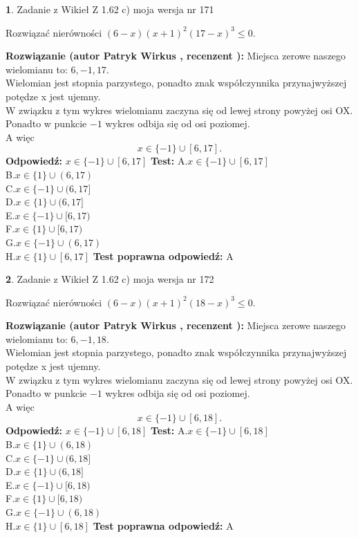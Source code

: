 \documentclass[12pt, a4paper]{article}
\theoremstyle{definition} %
\newtheorem{zad}{}
\newcommand{\zadStart}[1]{\begin{zad}#1\newline}
\newcommand{\zadStop}{\end{zad}}
\newcommand{\rozwStart}[2]{\noindent \textbf{Rozwiązanie (autor #1 , recenzent #2): }\newline}
\newcommand{\rozwStop}{\newline}
\newcommand{\odpStart}{\noindent \textbf{Odpowiedź:}\newline}
\newcommand{\odpStop}{\newline}
\newcommand{\testStart}{\noindent \textbf{Test:}\newline}
\newcommand{\testStop}{\newline}
\newcommand{\kluczStart}{\noindent \textbf{Test poprawna odpowiedź:}\newline}
\newcommand{\kluczStop}{\newline}
\begin{document}
\zadStart{Zadanie z Wikieł Z 1.62 c) moja wersja nr 171}

Rozwiązać nierówności $(6-x)(x+1)^{2}(17-x)^{3}\le0$.
\zadStop
\rozwStart{Patryk Wirkus}{}
Miejsca zerowe naszego wielomianu to: $6, -1, 17$.\\
Wielomian jest stopnia parzystego, ponadto znak współczynnika przy\linebreak najwyższej potędze x jest ujemny.\\ W związku z tym wykres wielomianu zaczyna się od lewej strony powyżej osi OX.\\
Ponadto w punkcie $-1$ wykres odbija się od osi poziomej.\\
A więc $$x \in \{-1\} \cup [6,17].$$
\rozwStop
\odpStart
$x \in \{-1\} \cup [6,17]$
\odpStop
\testStart
A.$x \in \{-1\} \cup [6,17]$\\
B.$x \in \{1\} \cup (6,17)$\\
C.$x \in \{-1\} \cup (6,17]$\\
D.$x \in \{1\} \cup (6,17]$\\
E.$x \in \{-1\} \cup [6,17)$\\
F.$x \in \{1\} \cup [6,17)$\\
G.$x \in \{-1\} \cup (6,17)$\\
H.$x \in \{1\} \cup [6,17]$
\testStop
\kluczStart
A
\kluczStop



\zadStart{Zadanie z Wikieł Z 1.62 c) moja wersja nr 172}

Rozwiązać nierówności $(6-x)(x+1)^{2}(18-x)^{3}\le0$.
\zadStop
\rozwStart{Patryk Wirkus}{}
Miejsca zerowe naszego wielomianu to: $6, -1, 18$.\\
Wielomian jest stopnia parzystego, ponadto znak współczynnika przy\linebreak najwyższej potędze x jest ujemny.\\ W związku z tym wykres wielomianu zaczyna się od lewej strony powyżej osi OX.\\
Ponadto w punkcie $-1$ wykres odbija się od osi poziomej.\\
A więc $$x \in \{-1\} \cup [6,18].$$
\rozwStop
\odpStart
$x \in \{-1\} \cup [6,18]$
\odpStop
\testStart
A.$x \in \{-1\} \cup [6,18]$\\
B.$x \in \{1\} \cup (6,18)$\\
C.$x \in \{-1\} \cup (6,18]$\\
D.$x \in \{1\} \cup (6,18]$\\
E.$x \in \{-1\} \cup [6,18)$\\
F.$x \in \{1\} \cup [6,18)$\\
G.$x \in \{-1\} \cup (6,18)$\\
H.$x \in \{1\} \cup [6,18]$
\testStop
\kluczStart
A
\kluczStop
\end{document}
